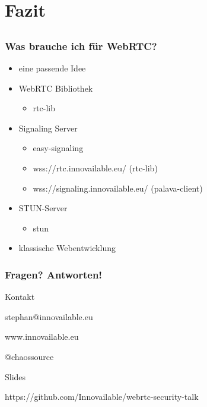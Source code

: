 \documentclass[12pt]{beamer}
\begin{document}
\section{Fazit}
\subsection{}

\begin{frame}
  \frametitle{Was brauche ich für WebRTC?}
  \begin{itemize}
    \onslide<+->{}
    \item<+-> eine passende Idee
    \item<+-> WebRTC Bibliothek
    \begin{itemize}
      \item<+-> rtc-lib   \onslide<+->{\dots}
    \end{itemize}
    \item<+-> Signaling Server
    \begin{itemize}
      \item<+-> easy-signaling\onslide<+->{ \dots}
      \item<+-> wss://rtc.innovailable.eu/ (rtc-lib)
      \item<+-> wss://signaling.innovailable.eu/ (palava-client)
    \end{itemize}
    \item<+-> STUN-Server
    \begin{itemize}
      \item<+-> stun\onslide<+->{ \dots}
    \end{itemize}
    \item<+-> klassische Webentwicklung
  \end{itemize}
\end{frame}

\begin{frame}
  \frametitle{Fragen? Antworten!}

  \centerline{\scriptsize{Kontakt}}
  \centerline{stephan@innovailable.eu}
  \centerline{www.innovailable.eu}
  \centerline{@chaossource}

  \vspace{0.2in}

  \centerline{\scriptsize{Slides}}
  \centerline{https://github.com/Innovailable/webrtc-security-talk}
\end{frame}
\end{document}
